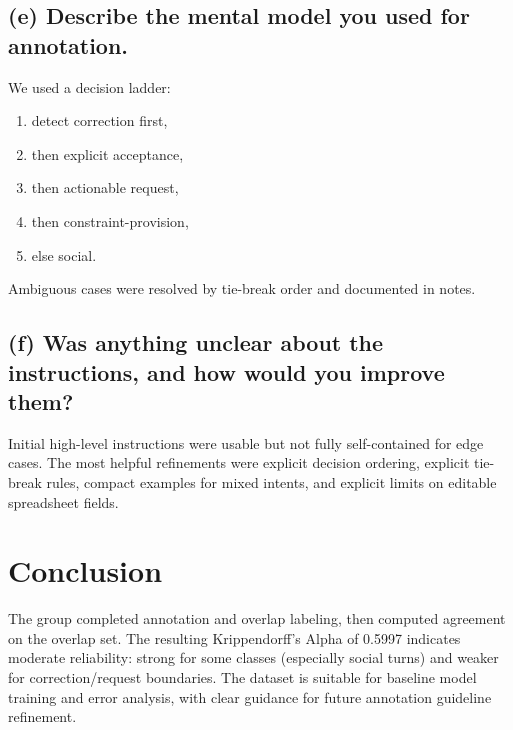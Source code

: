 \documentclass[11pt]{article}
\begin{document}
\subsection*{(e) Describe the mental model you used for annotation.}
We used a decision ladder:
\begin{enumerate}
  \item detect correction first,
  \item then explicit acceptance,
  \item then actionable request,
  \item then constraint-provision,
  \item else social.
\end{enumerate}
Ambiguous cases were resolved by tie-break order and documented in notes.

\subsection*{(f) Was anything unclear about the instructions, and how would you improve them?}
Initial high-level instructions were usable but not fully self-contained for edge cases. The most helpful refinements were explicit decision ordering, explicit tie-break rules, compact examples for mixed intents, and explicit limits on editable spreadsheet fields.

\section{Conclusion}
The group completed annotation and overlap labeling, then computed agreement on the overlap set. The resulting Krippendorff's Alpha of 0.5997 indicates moderate reliability: strong for some classes (especially social turns) and weaker for correction/request boundaries. The dataset is suitable for baseline model training and error analysis, with clear guidance for future annotation guideline refinement.
\end{document}

